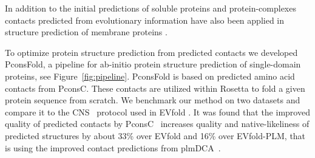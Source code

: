\documentclass{bioinfo}
\begin{document}
In addition to the initial predictions of soluble proteins \cite[]{marks_protein_2011}
and protein-complexes \cite[]{Schug20018738}  contacts predicted from evolutionary information
have also been applied in structure prediction of membrane proteins
\cite[]{hopf_three-dimensional_2012, nugent_accurate_2012}.

To optimize protein structure prediction from predicted contacts we
developed PconsFold, a pipeline for ab-initio protein structure
prediction of  single-domain proteins, see Figure~\ref{fig:pipeline}. PconsFold is based on predicted
amino acid contacts from PconsC. These contacts are utilized within
Rosetta to fold a given protein sequence from scratch. We benchmark
our method on two datasets and compare it to the CNS~\cite[]{Brunger18007608} protocol used in EVfold
\cite[]{marks_protein_2011}. It was found that the improved quality of predicted contacts
by PconsC~\cite[]{skwark_PconsC:_2013} increases quality and
native-likeliness of predicted structures by about 33\% over 
EVfold and 16\% over EVfold-PLM, that is using the improved contact
predictions from plmDCA~\cite[]{ekeberg_improved_2013}.
\end{document}
